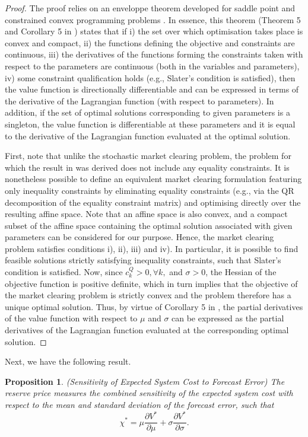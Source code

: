 \documentclass{article}
\newtheorem{proposition}{Proposition}
\begin{document}
\begin{proof}
The proof relies on an enveloppe theorem developed for saddle point and constrained convex programming problems \cite{Milgrom2002}. In essence, this theorem (Theorem 5 and Corollary 5 in \cite{Milgrom2002}) states that if i) the set over which optimisation takes place is convex and compact, ii) the functions defining the objective and constraints are continuous, iii) the derivatives of the functions forming the constraints taken with respect to the parameters are continuous (both in the variables and parameters), iv) some constraint qualification holds (e.g., Slater's condition is satisfied), then the value function is directionally differentiable and can be expressed in terms of the derivative of the Lagrangian function (with respect to parameters). In addition, if the set of optimal solutions corresponding to given parameters is a singleton, the value function is differentiable at these parameters and it is equal to the derivative of the Lagrangian function evaluated at the optimal solution.

First, note that unlike the stochastic market clearing problem, the problem for which the result in \cite{Milgrom2002} was derived does not include any equality constraints. It is nonetheless possible to define an equivalent market clearing formulation featuring only inequality constraints by eliminating equality constraints (e.g., via the QR decomposition of the equality constraint matrix) and optimising directly over the resulting affine space. Note that an affine space is also convex, and a compact subset of the affine space containing the optimal solution associated with given parameters can be considered for our purpose. Hence, the market clearing problem satisfies conditions i), ii), iii) and iv). In particular, it is possible to find feasible solutions strictly satisfying inequality constraints, such that Slater's condition is satisfied. Now, since $c_k^Q > 0, \forall k,$ and $\sigma > 0$, the Hessian of the objective function is positive definite, which in turn implies that the objective of the market clearing problem is strictly convex and the problem therefore has a unique optimal solution. Thus, by virtue of Corollary 5 in \cite{Milgrom2002}, the partial derivatives of the value function with respect to $\mu$ and $\sigma$ can be expressed as the partial derivatives of the Lagrangian function evaluated at the corresponding optimal solution.
\end{proof}
Next, we have the following result.
\begin{proposition}
(Sensitivity of Expected System Cost to Forecast Error) The reserve price measures the combined sensitivity of the expected system cost with respect to the mean and standard deviation of the forecast error, such that
\begin{equation*}
\chi^* = \mu \frac{\partial V^*}{\partial \mu} + \sigma \frac{\partial V^*}{\partial \sigma}.
\end{equation*}
\end{proposition}
\end{document}
